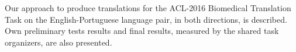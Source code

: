 Our approach to produce translations for the ACL-2016 Biomedical Translation Task on the English-Portuguese language pair, in both directions, is described. Own preliminary tests results and final results, measured by the shared task organizers, are also presented.
